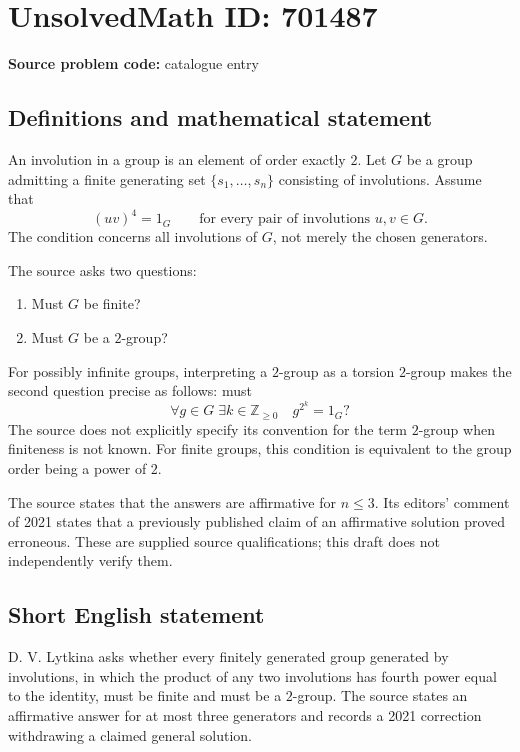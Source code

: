 \documentclass[11pt]{article}
\newcommand{\Z}{\mathbb{Z}}
\begin{document}
\section*{UnsolvedMath ID: 701487}
\textbf{Source problem code:} catalogue entry
\subsection{Definitions and mathematical statement}
An involution in a group is an element of order exactly \(2\). Let \(G\) be a group admitting a finite generating set \(\{s_1,\ldots,s_n\}\) consisting of involutions. Assume that
\[
(uv)^4=1_G
\qquad\text{for every pair of involutions }u,v\in G.
\]
The condition concerns all involutions of \(G\), not merely the chosen generators.

The source asks two questions:
\begin{enumerate}
\item Must \(G\) be finite?
\item Must \(G\) be a \(2\)-group?
\end{enumerate}
For possibly infinite groups, interpreting a \(2\)-group as a torsion \(2\)-group makes the second question precise as follows: must
\[
\forall g\in G\;\exists k\in\Z_{\geq 0}\quad g^{2^k}=1_G?
\]
The source does not explicitly specify its convention for the term \(2\)-group when finiteness is not known. For finite groups, this condition is equivalent to the group order being a power of \(2\).

The source states that the answers are affirmative for \(n\leq 3\). Its editors' comment of 2021 states that a previously published claim of an affirmative solution proved erroneous. These are supplied source qualifications; this draft does not independently verify them.
\subsection{Short English statement}
D. V. Lytkina asks whether every finitely generated group generated by involutions, in which the product of any two involutions has fourth power equal to the identity, must be finite and must be a \(2\)-group. The source states an affirmative answer for at most three generators and records a 2021 correction withdrawing a claimed general solution.
\end{document}
